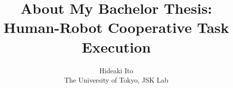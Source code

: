 \documentclass[letterpaper, 10 pt, conference]{ieeeconf}  %
\title{\LARGE \bf
About My Bachelor Thesis:\\ %
Human-Robot Cooperative Task Execution
}
\author{Hideaki Ito\\
  The University of Tokyo, JSK Lab
}
\begin{document}
\maketitle
\thispagestyle{empty}
\pagestyle{empty}

\setlength{\floatsep}{2pt} %
\setlength{\textfloatsep}{2pt} %



\begin{abstract}

\end{abstract}







\addtolength{\textheight}{-12cm}   %




\end{document}
